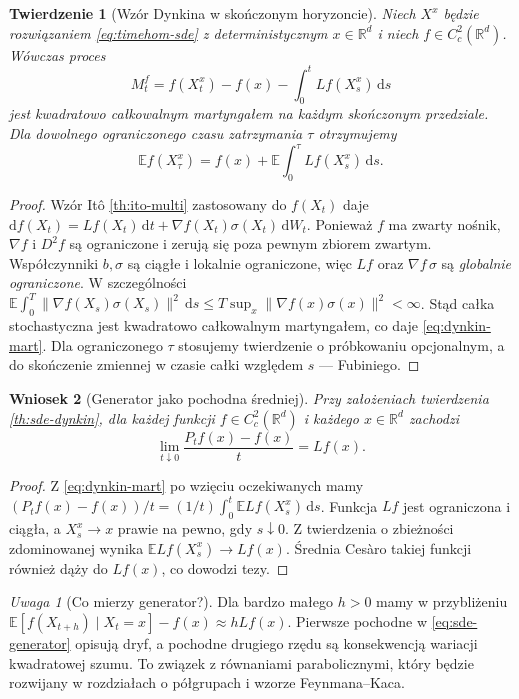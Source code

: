 \documentclass[11pt,a4paper,oneside]{report}
\numberwithin{equation}{chapter}
\theoremstyle{plain}
\newtheorem{twierdzenie}{Twierdzenie}[chapter]
\newtheorem{wniosek}[twierdzenie]{Wniosek}
\theoremstyle{definition}
\theoremstyle{remark}
\newtheorem{uwaga}{Uwaga}[chapter]
\newcommand{\R}{\mathbb{R}}
\newcommand{\E}{\mathbb{E}}
\newcommand{\dd}{\mathrm{d}}
\newcommand{\norm}[1]{\lVert #1\rVert}
\begin{document}
\begin{twierdzenie}[Wzór Dynkina w skończonym horyzoncie]\label{thm:volIII:06:03}
\label{th:sde-dynkin}
Niech $X^x$ będzie rozwiązaniem \eqref{eq:timehom-sde}
z deterministycznym $x\in\R^d$ i niech
$f\in C_c^2(\R^d)$. Wówczas proces
\[
M_t^f=f(X_t^x)-f(x)-\int_0^tLf(X_s^x)\,\dd s
\tag{6.6}\label{eq:dynkin-mart}
\]
jest kwadratowo całkowalnym martyngałem na każdym
skończonym przedziale. Dla dowolnego ograniczonego
czasu zatrzymania $\tau$ otrzymujemy
\[
\E f(X_\tau^x)=f(x)+\E\int_0^\tau Lf(X_s^x)\,\dd s.
\tag{6.7}\label{eq:dynkin-optional}
\]
\end{twierdzenie}
\begin{proof}
Wzór Itô \ref{th:ito-multi} zastosowany do $f(X_t)$
daje
$\dd f(X_t)=Lf(X_t)\,\dd t+
\nabla f(X_t)\sigma(X_t)\,\dd W_t$.
Ponieważ $f$ ma zwarty nośnik, $\nabla f$ i
$D^2 f$ są ograniczone i zerują się poza pewnym
zbiorem zwartym. Współczynniki $b,\sigma$ są
ciągłe i lokalnie ograniczone, więc $Lf$ oraz
$\nabla f\,\sigma$ są \emph{globalnie ograniczone}.
W szczególności
$\E\int_0^T\norm{\nabla f(X_s)\sigma(X_s)}^2\,\dd s
\le T\sup_x\norm{\nabla f(x)\sigma(x)}^2<\infty$.
Stąd całka stochastyczna jest kwadratowo całkowalnym
martyngałem, co daje \eqref{eq:dynkin-mart}.
Dla ograniczonego $\tau$ stosujemy twierdzenie
o próbkowaniu opcjonalnym, a do skończenie zmiennej
w czasie całki względem $s$ — Fubiniego.
\end{proof}

\begin{wniosek}[Generator jako pochodna średniej]\label{cor:volIII:06:01}
\label{cor:sde-gen-limit}
Przy założeniach twierdzenia \ref{th:sde-dynkin},
dla każdej funkcji $f\in C_c^2(\R^d)$ i każdego
$x\in\R^d$ zachodzi
\[
\lim_{t\downarrow0}\frac{P_tf(x)-f(x)}{t}=Lf(x).
\tag{6.8}\label{eq:genlimit}
\]
\end{wniosek}
\begin{proof}
Z \eqref{eq:dynkin-mart} po wzięciu oczekiwanych mamy
$(P_tf(x)-f(x))/t=(1/t)\int_0^t\E Lf(X_s^x)\,\dd s$.
Funkcja $Lf$ jest ograniczona i ciągła, a
$X_s^x\to x$ prawie na pewno, gdy $s\downarrow0$.
Z twierdzenia o zbieżności zdominowanej wynika
$\E Lf(X_s^x)\to Lf(x)$.
Średnia Cesàro takiej funkcji również dąży do
$Lf(x)$, co dowodzi tezy.
\end{proof}

\begin{uwaga}[Co mierzy generator?]
Dla bardzo małego $h>0$ mamy w przybliżeniu
$\E[f(X_{t+h})\mid X_t=x]-f(x)\approx hLf(x)$.
Pierwsze pochodne w \eqref{eq:sde-generator}
opisują dryf, a pochodne drugiego rzędu są
konsekwencją wariacji kwadratowej szumu.
To związek z równaniami parabolicznymi, który
będzie rozwijany w rozdziałach o półgrupach i
wzorze Feynmana--Kaca.
\end{uwaga}
\end{document}
